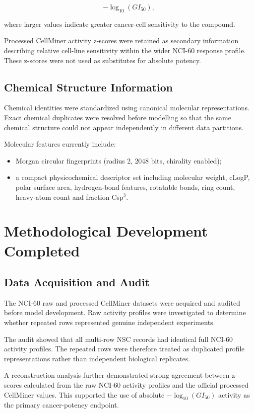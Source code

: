 \documentclass[11pt,a4paper]{article}
\begin{document}
\[
-\log_{10}(GI_{50}),
\]

where larger values indicate greater cancer-cell sensitivity to the compound.

Processed CellMiner activity z-scores were retained as secondary information describing relative cell-line sensitivity within the wider NCI-60 response profile. These z-scores were not used as substitutes for absolute potency.

\subsection{Chemical Structure Information}

Chemical identities were standardized using canonical molecular representations. Exact chemical duplicates were resolved before modelling so that the same chemical structure could not appear independently in different data partitions.

Molecular features currently include:

\begin{itemize}[leftmargin=1.6em]
    \item Morgan circular fingerprints (radius 2, 2048 bits, chirality enabled);
    \item a compact physicochemical descriptor set including molecular weight, cLogP, polar surface area, hydrogen-bond features, rotatable bonds, ring count, heavy-atom count and fraction Csp$^3$.
\end{itemize}

\section{Methodological Development Completed}

\subsection{Data Acquisition and Audit}

The NCI-60 raw and processed CellMiner datasets were acquired and audited before model development. Raw activity profiles were investigated to determine whether repeated rows represented genuine independent experiments.

The audit showed that all multi-row NSC records had identical full NCI-60 activity profiles. The repeated rows were therefore treated as duplicated profile representations rather than independent biological replicates.

A reconstruction analysis further demonstrated strong agreement between z-scores calculated from the raw NCI-60 activity profiles and the official processed CellMiner values. This supported the use of absolute $-\log_{10}(GI_{50})$ activity as the primary cancer-potency endpoint.
\end{document}
